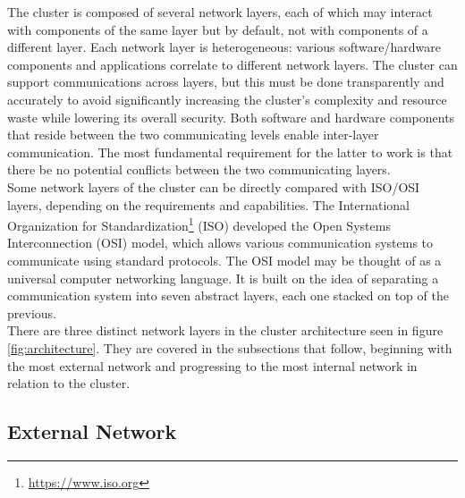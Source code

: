 The cluster is composed of several network layers, each of which may interact
with components of the same layer but by default, not with components of a different
layer. Each network layer is heterogeneous: various software/hardware components
and applications correlate to different network layers. The cluster can support
communications across layers, but this must be done transparently and accurately
to avoid significantly increasing the cluster's complexity and resource waste while
lowering its overall security. Both software and hardware components that reside
between the two communicating levels enable inter-layer communication. The most fundamental
requirement for the latter to work is that there be no potential conflicts between
the two communicating layers. \\ %
Some network layers of the cluster can be directly compared with ISO/OSI layers,
depending on the requirements and capabilities. The International Organization for
Standardization\footnote{\url{https://www.iso.org}} (ISO) developed the Open Systems
Interconnection (OSI) model, which allows various communication systems to
communicate using standard protocols. The OSI model may be thought of as a universal
computer networking language. It is built on the idea of separating a
communication system into seven abstract layers, each one stacked on top of the previous\cite{osi}.
\\ %
There are three distinct network layers in the cluster architecture seen in
figure \ref{fig:architecture}. They are covered in the subsections that follow,
beginning with the most external network and progressing to the most internal
network in relation to the cluster.

\subsection{External Network}
\label{subsec:architecture_network_external_network}

